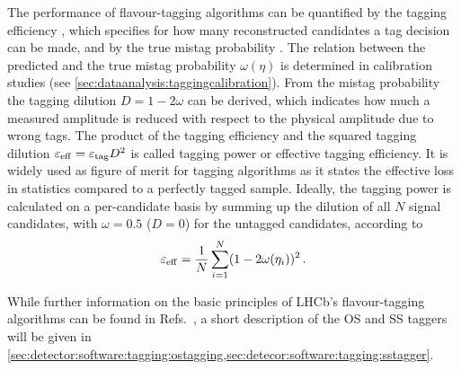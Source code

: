 The performance of flavour-tagging algorithms can be quantified by the tagging
efficiency \etag, which specifies for how many reconstructed candidates a tag
decision can be made, and by the true mistag probability \mistag. The relation
between the predicted and the true mistag probability $\omega(\eta)$ is
determined in calibration studies (see
\cref{sec:dataanalysis:taggingcalibration}). From the mistag probability the
tagging dilution $D = 1 - 2\omega$ can be derived, which indicates how much a
measured amplitude is reduced with respect to the physical amplitude due to
wrong tags. The product of the tagging efficiency and the squared tagging
dilution $\varepsilon_{\mathrm{eff}} = {\varepsilon_{\mathrm{tag}}} D^2$ is called tagging power or effective tagging
efficiency. It is widely used as figure of merit for tagging algorithms as it
states the effective loss in statistics compared to a perfectly tagged sample.
Ideally, the tagging power is calculated on a per-candidate basis by summing up the dilution of all $N$ signal candidates, with $\omega = 0.5$
($D=0$) for the untagged candidates, according to
\begin{equation}
	\varepsilon_{\mathrm{eff}} = \frac{1}{N}\sum_{i=1}^{N} (1 - 2\omega(\eta_i))^2\,.
\label{eq:detector:tagging:taggingpowerperevent}
\end{equation}

While further information on the basic principles of LHCb's flavour-tagging
algorithms can be found in Refs.~\cite{LHCb-CONF-2011-003,Grabalosa:1456804},
a short description of the OS and SS taggers will be given in
\cref{sec:detector:software:tagging:ostagging,sec:detecor:software:tagging:sstagger}.



